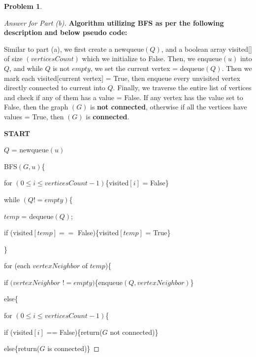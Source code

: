 \documentclass[11pt]{article}
\theoremstyle{definition}
\theoremstyle{definition}
\newtheorem{required}{Problem}
\theoremstyle{definition}
\begin{document}
\begin{required}
\begin{enumerate}[label=(\alph*)]
\begin{proof}[Answer for Part (b)]
\item \textbf{Algorithm utilizing BFS as per the following description and below pseudo code: \ } 
\item Similar to part (a), we first create a newqueue$(Q)$, and a boolean array visited[] of size $(verticesCount)$ which we initialize to False. Then, we enqueue$(u)$ into $Q$, and while $Q$ is not $empty$, we set the current vertex = dequeue$(Q)$. Then we mark each visited[current vertex] = True, then enqueue every unvisited vertex directly connected to current into $Q$. Finally, we traverse the entire list of vertices and check if any of them has a value = False. If any vertex has the value set to False, then the graph $(G)$ is \textbf{not connected}, otherwise if all the vertices have values = True, then $(G)$ is \textbf{connected}. \\
\item \textbf{START} \
\item $Q$ = newqueue$(u)$ \
\item	\hspace*{0mm} BFS$(G, u)$\{
\item	\hspace*{10mm} for $(0 \leq i \leq verticesCount-1)$\{visited$[i]$ = False\}
\item	\hspace*{10mm} while $(Q != empty)$\{
\item	\hspace*{20mm} $temp$ = dequeue$(Q)$; \
\item	\hspace*{20mm} if (visited$[temp] ==$ False)\{visited$[temp]$ = True\}
\item	\hspace*{20mm} \}
\item	\hspace*{10mm} for (each $vertexNeighbor$ of $temp$)\{
\item	\hspace*{20mm} if $(vertexNeighbor$ $!= empty)$\{enqueue$(Q, vertexNeighbor)$\}
\item	\hspace*{20mm} else\{
\item	\hspace*{30mm} for $(0 \leq i \leq verticesCount-1)$\{
\item	\hspace*{40mm} if (visited$[i]$ == False)\{return($G$ not connected)\}
\item	\hspace*{40mm} else\{return($G$ is connected)\}

\end{proof}
\end{enumerate}
\end{required}
\end{document}
